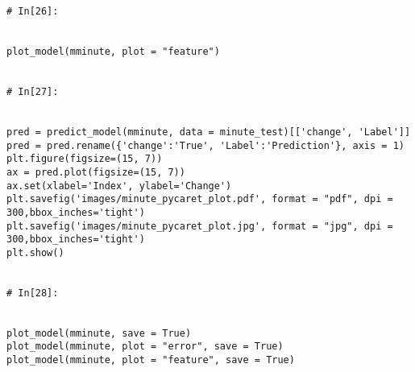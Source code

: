 \documentclass[12pt,a4paper]{article}
\begin{document}
\begin{lstlisting}[breaklines]
# In[26]:


plot_model(mminute, plot = "feature")


# In[27]:


pred = predict_model(mminute, data = minute_test)[['change', 'Label']]
pred = pred.rename({'change':'True', 'Label':'Prediction'}, axis = 1)
plt.figure(figsize=(15, 7))
ax = pred.plot(figsize=(15, 7))
ax.set(xlabel='Index', ylabel='Change')
plt.savefig('images/minute_pycaret_plot.pdf', format = "pdf", dpi = 300,bbox_inches='tight')
plt.savefig('images/minute_pycaret_plot.jpg', format = "jpg", dpi = 300,bbox_inches='tight')
plt.show()


# In[28]:


plot_model(mminute, save = True)
plot_model(mminute, plot = "error", save = True)
plot_model(mminute, plot = "feature", save = True)


\end{lstlisting}
\end{document}
